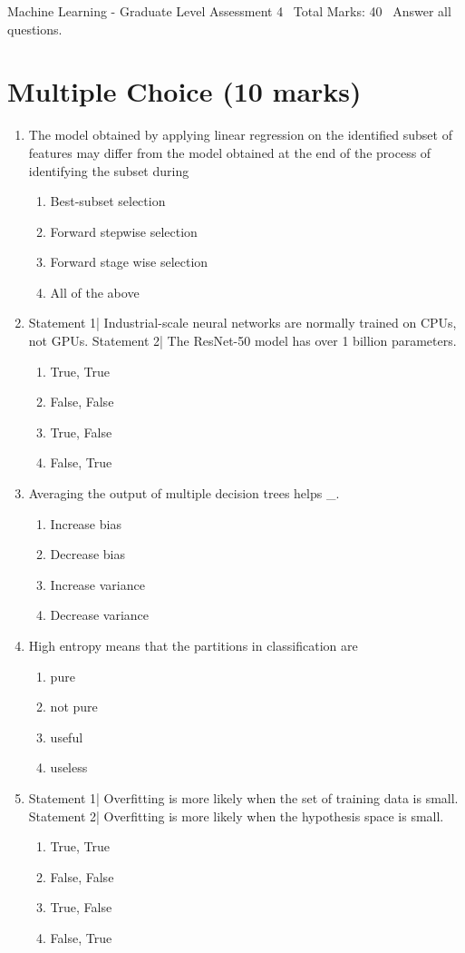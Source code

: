 \documentclass[12pt]{article}
\begin{document}
\begin{center}
Machine Learning - Graduate Level Assessment 4 \
Total Marks: 40 \
Answer all questions.
\end{center}

\section*{Multiple Choice (10 marks)}
\begin{enumerate}[label=\arabic*.]
\item The model obtained by applying linear regression on the identified subset of features may differ from the model obtained at the end of the process of identifying the subset during
\begin{enumerate}[label=(\alph*)]
    \item Best-subset selection
    \item Forward stepwise selection
    \item Forward stage wise selection
    \item All of the above
\end{enumerate}
\item Statement 1| Industrial-scale neural networks are normally trained on CPUs, not GPUs. Statement 2| The ResNet-50 model has over 1 billion parameters.
\begin{enumerate}[label=(\alph*)]
    \item True, True
    \item False, False
    \item True, False
    \item False, True
\end{enumerate}
\item Averaging the output of multiple decision trees helps \_.
\begin{enumerate}[label=(\alph*)]
    \item Increase bias
    \item Decrease bias
    \item Increase variance
    \item Decrease variance
\end{enumerate}
\item High entropy means that the partitions in classification are
\begin{enumerate}[label=(\alph*)]
    \item pure
    \item not pure
    \item useful
    \item useless
\end{enumerate}
\item Statement 1| Overfitting is more likely when the set of training data is small. Statement 2| Overfitting is more likely when the hypothesis space is small.
\begin{enumerate}[label=(\alph*)]
    \item True, True
    \item False, False
    \item True, False
    \item False, True
\end{enumerate}
\end{enumerate}
\end{document}
